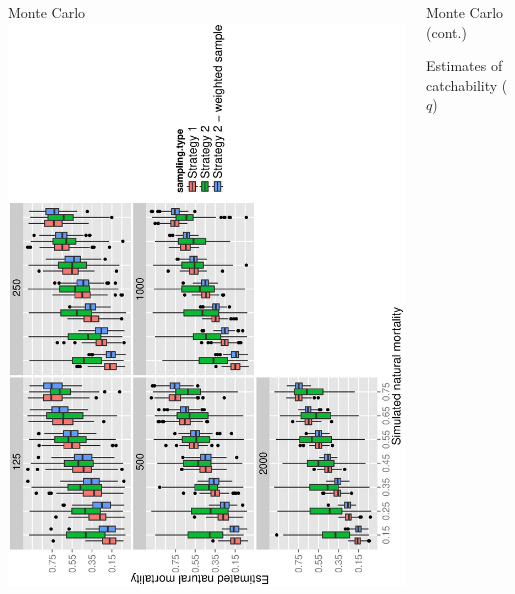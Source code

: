 \documentclass[final]{beamer}
\begin{document}
\begin{frame}{}
\begin{columns}[t]
\begin{column}{.47\linewidth}
\begin{block}{Monte Carlo}
        \includegraphics[scale=1.2,angle=-90]{../../Results/Graphics/Estimating-NaturalMortality4PresentationColour.ps}
        
      \end{block}

    \end{column}
    
    \begin{column}{.47\linewidth}

      
      \begin{block}{Monte Carlo (cont.)}

        Estimates of catchability ($q$)
        

\end{block}
\end{column}
\end{columns}
\end{frame}
\end{document}
